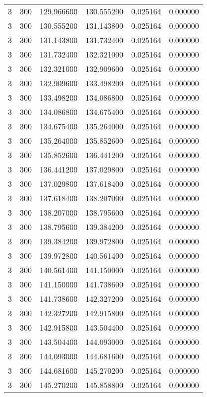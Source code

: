 \begin{longtable}{rrrrrr}
3 & 300 & 129.966600 & 130.555200 & 0.025164 & 0.000000 \\
3 & 300 & 130.555200 & 131.143800 & 0.025164 & 0.000000 \\
3 & 300 & 131.143800 & 131.732400 & 0.025164 & 0.000000 \\
3 & 300 & 131.732400 & 132.321000 & 0.025164 & 0.000000 \\
3 & 300 & 132.321000 & 132.909600 & 0.025164 & 0.000000 \\
3 & 300 & 132.909600 & 133.498200 & 0.025164 & 0.000000 \\
3 & 300 & 133.498200 & 134.086800 & 0.025164 & 0.000000 \\
3 & 300 & 134.086800 & 134.675400 & 0.025164 & 0.000000 \\
3 & 300 & 134.675400 & 135.264000 & 0.025164 & 0.000000 \\
3 & 300 & 135.264000 & 135.852600 & 0.025164 & 0.000000 \\
3 & 300 & 135.852600 & 136.441200 & 0.025164 & 0.000000 \\
3 & 300 & 136.441200 & 137.029800 & 0.025164 & 0.000000 \\
3 & 300 & 137.029800 & 137.618400 & 0.025164 & 0.000000 \\
3 & 300 & 137.618400 & 138.207000 & 0.025164 & 0.000000 \\
3 & 300 & 138.207000 & 138.795600 & 0.025164 & 0.000000 \\
3 & 300 & 138.795600 & 139.384200 & 0.025164 & 0.000000 \\
3 & 300 & 139.384200 & 139.972800 & 0.025164 & 0.000000 \\
3 & 300 & 139.972800 & 140.561400 & 0.025164 & 0.000000 \\
3 & 300 & 140.561400 & 141.150000 & 0.025164 & 0.000000 \\
3 & 300 & 141.150000 & 141.738600 & 0.025164 & 0.000000 \\
3 & 300 & 141.738600 & 142.327200 & 0.025164 & 0.000000 \\
3 & 300 & 142.327200 & 142.915800 & 0.025164 & 0.000000 \\
3 & 300 & 142.915800 & 143.504400 & 0.025164 & 0.000000 \\
3 & 300 & 143.504400 & 144.093000 & 0.025164 & 0.000000 \\
3 & 300 & 144.093000 & 144.681600 & 0.025164 & 0.000000 \\
3 & 300 & 144.681600 & 145.270200 & 0.025164 & 0.000000 \\
3 & 300 & 145.270200 & 145.858800 & 0.025164 & 0.000000 \\

\end{longtable}
